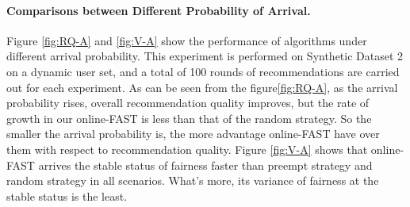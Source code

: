 \paragraph{Comparisons between Different Probability of Arrival.}  Figure \ref{fig:RQ-A} and \ref{fig:V-A} show the performance of algorithms under different arrival probability. This experiment is performed on Synthetic Dataset 2 on a dynamic user set, and a total of 100 rounds of recommendations are carried out for each experiment.
As can be seen from the figure\ref{fig:RQ-A}, as the arrival probability rises, overall recommendation quality improves, but the rate of growth in our online-FAST is less than that of the random strategy. So the smaller the arrival probability is, the more advantage online-FAST have over them with respect to recommendation quality. Figure \ref{fig:V-A} shows that online-FAST arrives the stable status of fairness faster than preempt strategy and random strategy in all scenarios. What's more, its variance of fairness at the stable status is the least.
